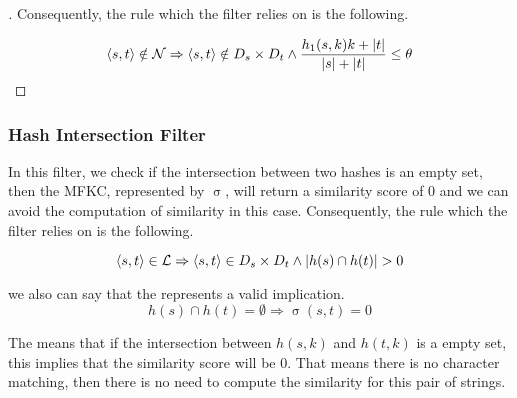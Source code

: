 \begin{proof}[]


Consequently, the rule which the filter relies on is the following.

\begin{equation}
	\langle s,t \rangle \notin \mathcal{N} \Rightarrow \langle s,t \rangle \notin {\ensuremath{D_s}}{} \times {\ensuremath{D_t}}{} \wedge \frac{h_1(s,k) k + |t|}{|s|+|t|} \leq \theta 
\end{equation}
\end{proof}

\subsubsection{Hash Intersection Filter} \label{hashintfilter}
In this filter, we check if the intersection between two hashes is an empty set, then the MFKC, represented by $\upsigma$, will return a similarity score of 0 and we can avoid the computation of similarity in this case.
Consequently, the rule which the filter relies on is the following.

\begin{equation}
	\langle s,t \rangle \in \mathcal{L} \Rightarrow \langle s,t \rangle \in {\ensuremath{D_s}}{} \times {\ensuremath{D_t}}{} \wedge |h(s) \cap h(t)| > 0
\end{equation}

we also can say that the  represents a valid implication.
\begin{equation} \label{h:1}
	h(s) \cap h(t) = \emptyset \Rightarrow \upsigma(s,t)=0
\end{equation}

The  means that if the intersection between $h(s,k)$ and $h(t,k)$ is a empty set, this implies that the similarity score will be 0.
That means there is no character matching, then there is no need to compute the similarity for this pair of strings.

